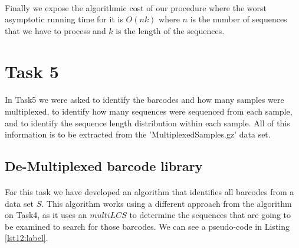 \documentclass[a4paper,10pt]{article}
\begin{document}
\paragraph{} Finally we expose the algorithmic cost of our procedure where the worst asymptotic running time for it is $O(nk)$ where $n$ is the number of sequences that we have to process and $k$ is the length of the sequences.

\newpage

\section{Task 5}

\paragraph{} In Task5 we were asked to identify the barcodes and how many samples were multiplexed, to identify how many sequences were sequenced from each sample, and to identify the sequence length distribution within each sample. All of this information is to be extracted from the 'MultiplexedSamples.gz' data set.

\subsection{De-Multiplexed barcode library}

\paragraph{} For this task we have developed an algorithm that identifies all barcodes from a data set $S$. This algorithm works using a different approach from the algorithm on Task4, as it uses an $multiLCS$ to determine the sequences that are going to be examined to search for those barcodes. We can see a pseudo-code in Listing \ref{lst12:label}.
\end{document}
